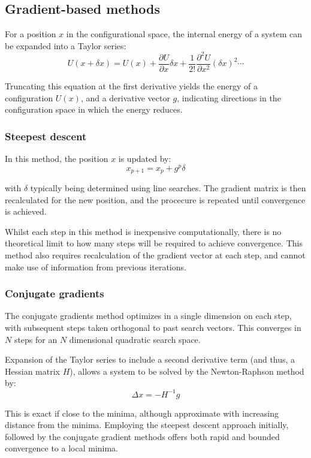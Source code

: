 \subsection{Gradient-based methods}

For a position $x$ in the configurational space, the internal energy of a system can be expanded into a Taylor series:
\begin{equation}
  U(x+\delta x) = U(x) + \frac{\partial U}{\partial x} \delta x + \frac{1}{2!} \frac{\partial ^2 U}{\partial x^2}(\delta x)^2 \cdots
\end{equation}

Truncating this equation at the first derivative yields the energy of a configuration $U(x)$, and a derivative vector $g$, indicating directions in the configuration space in which the energy reduces.

\subsubsection{Steepest descent}
In this method, the position $x$ is updated by:
\begin{equation}
x_{p+1} = x_p + g^p\delta
\end{equation}

with $\delta$ typically being determined using line searches.
The gradient matrix is then recalculated for the new position, and the procecure is repeated until convergence is achieved.

Whilst each step in this method is inexpensive computationally, there is no theoretical limit to how many steps will be required to achieve convergence.
This method also requires recalculation of the gradient vector at each step, and cannot make use of information from previous iterations.

\subsubsection{Conjugate gradients}
The conjugate gradients method optimizes in a single dimension on each step, with subsequent steps taken orthogonal to past search vectors.
This converges in $N$ steps for an $N$ dimensional quadratic search space.

Expansion of the Taylor series to include a second derivative term (and thus, a Hessian matrix $H$), allows a system to be solved by the Newton-Raphson method by:
$$
\Delta x = -H^{-1}g
$$

This is exact if close to the minima, although approximate with increasing distance from the minima.
Employing the steepest descent approach initially, followed by the conjugate gradient methods offers both rapid and bounded convergence to a local minima.


